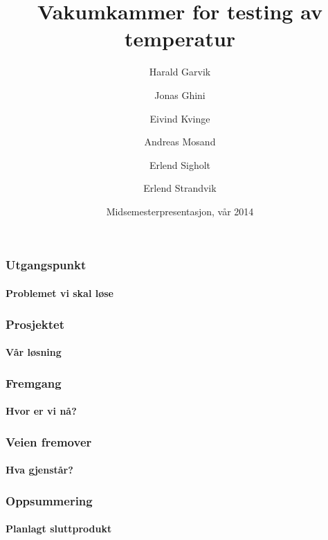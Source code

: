\documentclass{beamer}
\title[Vakumkammer] %
{Vakumkammer for testing av temperatur}
\author[Gruppe 1, TFE4850] %
{Harald Garvik  \and Jonas Ghini \and Eivind Kvinge \\ \and Andreas Mosand \and Erlend Sigholt \and Erlend Strandvik}
\date[2014] %
{Midsemesterpresentasjon, v\aa r 2014}
\begin{document}
  \frame{\titlepage}
  \begin{frame}
    \frametitle{Utgangspunkt}
    \framesubtitle{Problemet vi skal l\o se}
  \end{frame}
  \begin{frame}
    \frametitle{Prosjektet}
    \framesubtitle{V\aa r l\o sning}
  \end{frame}
  \begin{frame}
    \frametitle{Fremgang}
    \framesubtitle{Hvor er vi n\aa ?}
  \end{frame}
  \begin{frame}
    \frametitle{Veien fremover}
    \framesubtitle{Hva gjenst\aa r?}
  \end{frame}
  \begin{frame}
    \frametitle{Oppsummering}
    \framesubtitle{Planlagt sluttprodukt}
  \end{frame}
\end{document}
